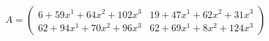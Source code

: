 \documentclass[preview]{standalone}
\begin{document}
\begin{align*}
A = \begin{pmatrix}6 + 59x^{1} + 64x^{2} + 102x^{3} & 19 + 47x^{1} + 62x^{2} + 31x^{3} \\ 62 + 94x^{1} + 70x^{2} + 96x^{3} & 62 + 69x^{1} + 8x^{2} + 124x^{3}\end{pmatrix}
\end{align*}
\end{document}
